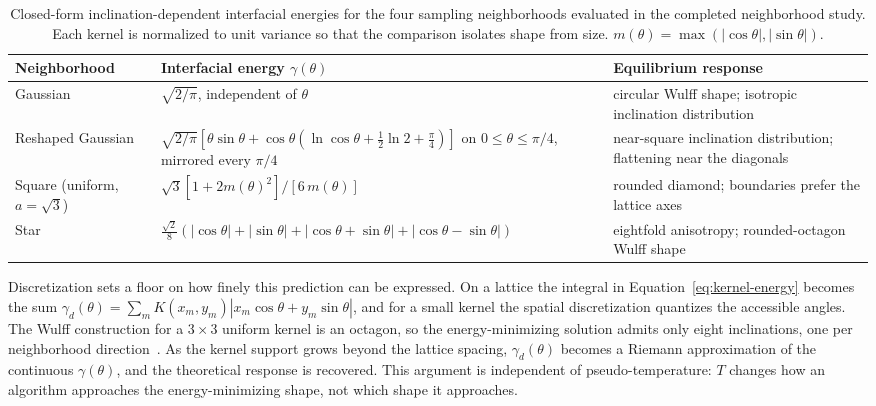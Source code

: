 \documentclass[proposalMode]{ufdissertation}
\begin{document}
\begin{table}[htbp]
\centering
\caption{Closed-form inclination-dependent interfacial energies for the four sampling neighborhoods evaluated in the completed neighborhood study. Each kernel is normalized to unit variance so that the comparison isolates shape from size. \(m(\theta)=\max\left(\left|\cos\theta\right|,\left|\sin\theta\right|\right)\).}
\label{tab:kernel-energies}
\small
\begin{tabularx}{\textwidth}{@{}>{\raggedright\arraybackslash}p{}>{\raggedright\arraybackslash}p{}X@{}}
\toprule
\textbf{Neighborhood} & \textbf{Interfacial energy \(\gamma(\theta)\)} & \textbf{Equilibrium response} \\
\midrule
Gaussian & \(\sqrt{2/\pi}\), independent of \(\theta\) & circular Wulff shape; isotropic inclination distribution \\
Reshaped Gaussian & \(\sqrt{2/\pi}\left[\theta\sin\theta+\cos\theta\left(\ln\cos\theta+\tfrac{1}{2}\ln 2+\tfrac{\pi}{4}\right)\right]\) on \(0\le\theta\le\pi/4\), mirrored every \(\pi/4\) & near-square inclination distribution; flattening near the diagonals \\
Square (uniform, \(a=\sqrt{3}\)) & \(\sqrt{3}\left[1+2m(\theta)^{2}\right]/\left[6\,m(\theta)\right]\) & rounded diamond; boundaries prefer the lattice axes \\
Star & \(\tfrac{\sqrt{2}}{8}\left(\left|\cos\theta\right|+\left|\sin\theta\right|+\left|\cos\theta+\sin\theta\right|+\left|\cos\theta-\sin\theta\right|\right)\) & eightfold anisotropy; rounded-octagon Wulff shape \\
\bottomrule
\end{tabularx}
\end{table}

Discretization sets a floor on how finely this prediction can be expressed. On a lattice the integral in Equation~\eqref{eq:kernel-energy} becomes the sum \(\gamma_d(\theta)=\sum_m K(x_m,y_m)\left|x_m\cos\theta+y_m\sin\theta\right|\), and for a small kernel the spatial discretization quantizes the accessible angles. The Wulff construction for a \(3\times3\) uniform kernel is an octagon, so the energy-minimizing solution admits only eight inclinations, one per neighborhood direction~\cite{qiu2024cylindrical}. As the kernel support grows beyond the lattice spacing, \(\gamma_d(\theta)\) becomes a Riemann approximation of the continuous \(\gamma(\theta)\), and the theoretical response is recovered. This argument is independent of pseudo-temperature: \(T\) changes how an algorithm approaches the energy-minimizing shape, not which shape it approaches.
\end{document}
